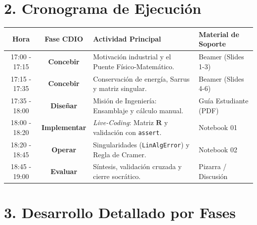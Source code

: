 \documentclass[11pt,a4paper]{article}
\begin{document}
\section*{2. Cronograma de Ejecución}
\begin{table}[h!]
    \centering
    \renewcommand{\arraystretch}{1.3}
    \begin{tabularx}{\textwidth}{@{} c c X l @{}}
        \toprule
        \textbf{Hora} & \textbf{Fase CDIO} & \textbf{Actividad Principal} & \textbf{Material de Soporte} \\
        \midrule
        17:00 - 17:15 & \textbf{Concebir} & Motivación industrial y el Puente Físico-Matemático. & Beamer (Slides 1-3) \\
        17:15 - 17:35 & \textbf{Concebir} & Conservación de energía, Sarrus y matriz singular. & Beamer (Slides 4-6) \\
        17:35 - 18:00 & \textbf{Diseñar} & Misión de Ingeniería: Ensamblaje y cálculo manual. & Guía Estudiante (PDF) \\
        18:00 - 18:20 & \textbf{Implementar} & \textit{Live-Coding}: Matriz $\mathbf{R}$ y validación con \texttt{assert}. & Notebook 01 \\
        18:20 - 18:45 & \textbf{Operar} & Singularidades (\texttt{LinAlgError}) y Regla de Cramer. & Notebook 02 \\
        18:45 - 19:00 & \textbf{Evaluar} & Síntesis, validación cruzada y cierre socrático. & Pizarra / Discusión \\
        \bottomrule
    \end{tabularx}
\end{table}

\section*{3. Desarrollo Detallado por Fases}
\end{document}
